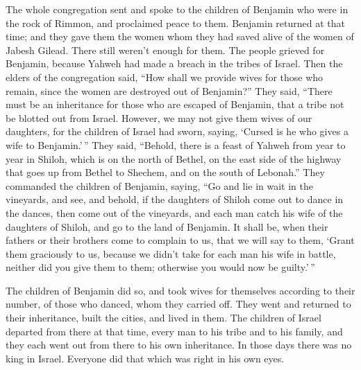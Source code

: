  The whole congregation sent and spoke to the children of
Benjamin who were in the rock of Rimmon, and proclaimed peace to them.
 Benjamin returned at that time; and they gave them the
women whom they had saved alive of the women of Jabesh Gilead. There
still weren't enough for them.  The people grieved for
Benjamin, because Yahweh had made a breach in the tribes of Israel.
 Then the elders of the congregation said, ``How shall we
provide wives for those who remain, since the women are destroyed out of
Benjamin?''  They said, ``There must be an inheritance for
those who are escaped of Benjamin, that a tribe not be blotted out from
Israel.  However, we may not give them wives of our
daughters, for the children of Israel had sworn, saying, `Cursed is he
who gives a wife to Benjamin.'\,''  They said, ``Behold,
there is a feast of Yahweh from year to year in Shiloh, which is on the
north of Bethel, on the east side of the highway that goes up from
Bethel to Shechem, and on the south of Lebonah.''  They
commanded the children of Benjamin, saying, ``Go and lie in wait in the
vineyards,  and see, and behold, if the daughters of Shiloh
come out to dance in the dances, then come out of the vineyards, and
each man catch his wife of the daughters of Shiloh, and go to the land
of Benjamin.  It shall be, when their fathers or their
brothers come to complain to us, that we will say to them, `Grant them
graciously to us, because we didn't take for each man his wife in
battle, neither did you give them to them; otherwise you would now be
guilty.'\,''

 The children of Benjamin did so, and took wives for
themselves according to their number, of those who danced, whom they
carried off. They went and returned to their inheritance, built the
cities, and lived in them.  The children of Israel departed
from there at that time, every man to his tribe and to his family, and
they each went out from there to his own inheritance.  In
those days there was no king in Israel. Everyone did that which was
right in his own eyes.
